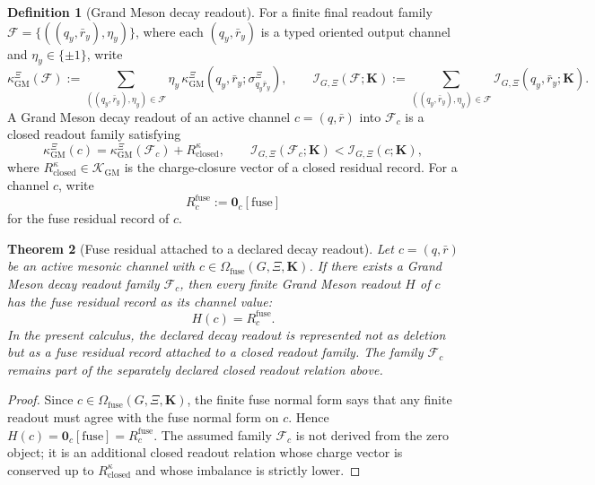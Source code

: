\documentclass[11pt]{article}
\theoremstyle{definition}
\newtheorem{definition}{Definition}
\theoremstyle{plain}
\newtheorem{theorem}[definition]{Theorem}
\begin{document}
\begin{definition}[Grand Meson decay readout]
For a finite final readout family
\(\mathcal F=\{((q_y,\bar r_y),\eta_y)\}\), where each
\((q_y,\bar r_y)\) is a typed oriented output channel and
\(\eta_y\in\{\pm1\}\), write
\[
  \kappa_{\mathrm{GM}}^{\Xi}(\mathcal F)
  :=
  \sum_{((q_y,\bar r_y),\eta_y)\in\mathcal F}
  \eta_y\,
  \kappa_{\mathrm{GM}}^{\Xi}
  (q_y,\bar r_y;\sigma^\Xi_{q_y\bar r_y}),
  \qquad
  \mathcal I_{G,\Xi}(\mathcal F;\mathbf K)
  :=
  \sum_{((q_y,\bar r_y),\eta_y)\in\mathcal F}
  \mathcal I_{G,\Xi}(q_y,\bar r_y;\mathbf K).
\]
A Grand Meson decay readout of an active channel \(c=(q,\bar r)\) into
\(\mathcal F_c\) is a closed readout family satisfying
\[
  \kappa_{\mathrm{GM}}^{\Xi}(c)
  =
  \kappa_{\mathrm{GM}}^{\Xi}(\mathcal F_c)
  +
  R^{\kappa}_{\mathrm{closed}},
  \qquad
  \mathcal I_{G,\Xi}(\mathcal F_c;\mathbf K)<\mathcal I_{G,\Xi}(c;\mathbf K),
\]
where \(R^{\kappa}_{\mathrm{closed}}\in\mathcal K_{\mathrm{GM}}\) is the
charge-closure vector of a closed residual record.  For a channel \(c\),
write
\[
  R_c^{\mathrm{fuse}}
  :=
  \mathbf 0_c[\mathrm{fuse}]
\]
for the fuse residual record of \(c\).
\end{definition}

\begin{theorem}[Fuse residual attached to a declared decay readout]
Let \(c=(q,\bar r)\) be an active mesonic channel with
\(c\in\Omega_{\mathrm{fuse}}(G,\Xi,\mathbf K)\).  If there exists a Grand
Meson decay readout family \(\mathcal F_c\), then every finite Grand Meson
readout \(H\) of \(c\) has the fuse residual record as its channel value:
\[
  H(c)=R_c^{\mathrm{fuse}}.
\]
In the present calculus, the declared decay readout is represented not as
deletion but as a fuse residual record attached to a closed readout family.
The family \(\mathcal F_c\) remains part of the separately declared closed
readout relation above.
\end{theorem}

\begin{proof}
Since \(c\in\Omega_{\mathrm{fuse}}(G,\Xi,\mathbf K)\), the finite fuse normal
form says that any finite readout must agree with the fuse normal form
on \(c\).  Hence \(H(c)=\mathbf 0_c[\mathrm{fuse}]=R_c^{\mathrm{fuse}}\).
The assumed family \(\mathcal F_c\) is not derived from the zero object; it
is an additional closed readout relation whose charge vector is conserved
up to \(R^{\kappa}_{\mathrm{closed}}\) and whose imbalance is strictly
lower.
\end{proof}
\end{document}
